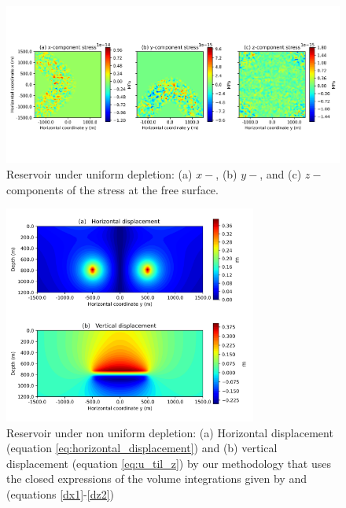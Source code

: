 \documentclass[journal abbreviation, manuscript]{copernicus}
\begin{document}
\begin{figure}[ht]
\includegraphics[width=12cm]{Fig/Figure_Null_stress.png}
\caption{Reservoir under uniform depletion: (a) $x-$, (b) $y-$, and (c) $z-$ components of the stress at the free surface.}
\label{fig:Null_stress}
\end{figure}




\begin{figure}[ht]
\includegraphics[width=8.3cm]{Fig/Figure_Displacement_non_uniform_depletion.png}
\caption{Reservoir under non uniform depletion: (a) Horizontal displacement (equation \ref{eq:horizontal_displacement}) and (b) vertical displacement (equation \ref{eq:u_til_z}) by our methodology that uses the closed expressions of the volume integrations given by \cite{Nagyetal2000} and \cite{Nagyetal2002} (equations \ref{dx1}-\ref{dz2})}
\label{fig:displacement_non_uniform_depletion}
\end{figure}
\end{document}
